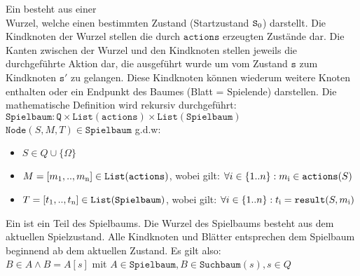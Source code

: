 \begin{Definition}
Ein  besteht aus einer \\Wurzel, welche einen bestimmten Zustand (Startzustand $\mathtt{S\textsubscript{0}}$) darstellt. Die Kindknoten der Wurzel stellen die durch $\mathtt{actions}$ erzeugten Zustände dar. Die Kanten zwischen der Wurzel und den Kindknoten stellen jeweils die durchgeführte Aktion dar, die ausgeführt wurde um vom Zustand $\mathtt{s}$ zum Kindknoten $\mathtt{s'}$ zu gelangen. Diese Kindknoten können wiederum weitere Knoten enthalten oder ein Endpunkt des Baumes (Blatt = Spielende)  darstellen.
Die mathematische Definition wird rekursiv durchgeführt:
\\$\mathtt{Spielbaum}: \mathtt{Q} \times \mathtt{List(actions)} \times \mathtt{List(Spielbaum)}$
\\$\mathtt{Node}(S,M,T) \in \mathtt{Spielbaum}$ g.d.w:
\begin{itemize}
\item $S \in Q \cup \{\Omega\}$
\item $M = [m\textsubscript{1}, .. , m \textsubscript{n}] \in \mathtt{List(actions)}$, wobei gilt:  $\forall i \in \{1 .. n\}: m\textsubscript{i} \in \mathtt{actions}(S) $
\item $T = [t\textsubscript{1}, .. , t \textsubscript{n}] \in \mathtt{List(Spielbaum)}$, wobei gilt: $ \forall i \in \{1 .. n\}: t\textsubscript{i} = \mathtt{result}(S, m\textsubscript{i}) $
\end{itemize}
\end{Definition}
\begin{Definition}
Ein  ist ein Teil des Spielbaums. Die Wurzel des Spielbaums besteht aus dem aktuellen Spielzustand. Alle Kindknoten und Blätter entsprechen dem Spielbaum beginnend ab dem aktuellen Zustand. Es gilt also:
\\ $B \in A \wedge B = A[s]$ mit $ A \in \mathtt{Spielbaum}, B \in \mathtt{Suchbaum}(s), s \in Q$
\end{Definition}
